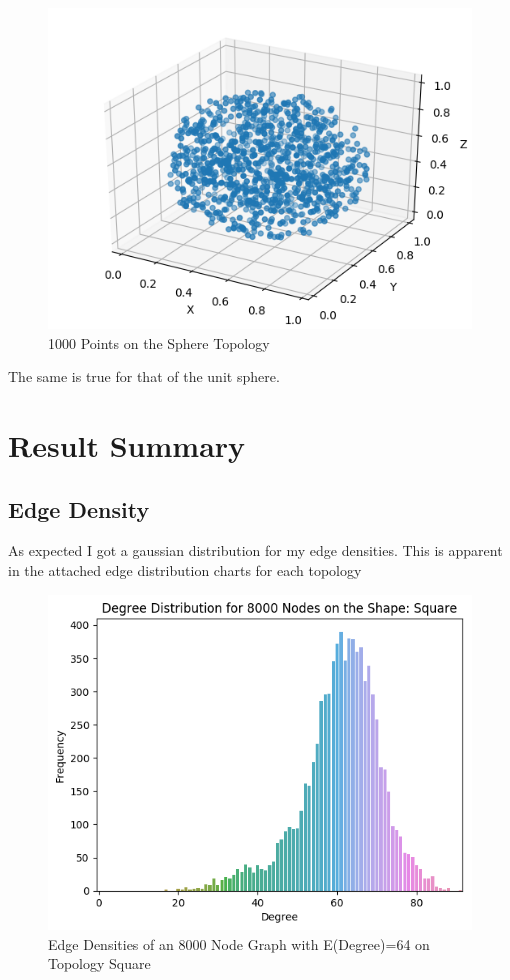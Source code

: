 \documentclass{article}
\begin{document}
    \begin{figure}[H]
      \centering
      \includegraphics[width=1 \textwidth]{sphere/drawing/sphere_drawing.png}
      \caption{1000 Points on the Sphere Topology}
    \end{figure}
    The same is true for that of the unit sphere.

\section{Result Summary}
  \subsection{Edge Density}
  As expected I got a gaussian distribution for my edge densities.
  This is apparent in the attached edge distribution charts for each topology
  \begin{figure}[H]
    \centering
    \includegraphics[width=1 \textwidth]{square/edge_density/8000_64.png}
    \caption{Edge Densities of an 8000 Node Graph with E(Degree)=64 on Topology Square}
  \end{figure}
\end{document}
